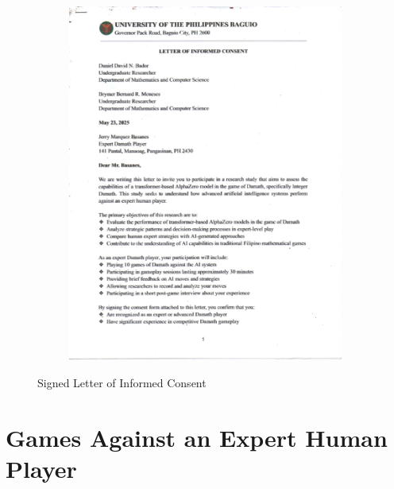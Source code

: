 \begin{appendices}
\begin{figure}[H]
\begin{subfigure}{0.3\textwidth}
        \includegraphics[page=3,width=\linewidth]{images/Letter of Informed Consent.pdf}
    \end{subfigure}
    \caption{Signed Letter of Informed Consent}
    \label{fig:signed-letter-of-informed-consent}
\end{figure}

\chapter{Games Against an Expert Human Player}


\end{appendices}
